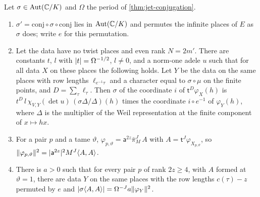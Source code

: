 \begin{lemma}\label{lem:galois-lift}
Let $\sigma\in\mathrm{Aut}(\mathbb{C}/K)$ and $\Omega$ the period of \cref{thm:jet-conjugation}.
\begin{enumerate}[label=\textup{(\alph*)}]
\item $\sigma'=\mathrm{conj}\circ\sigma\circ\mathrm{conj}$ lies in $\mathrm{Aut}(\mathbb{C}/K)$ and permutes the infinite places of $E$ as $\sigma$ does; write $e$ for this permutation.
\item Let the data have no twist places and even rank $N=2m'$. There are constants $t$, $l$ with $\lvert t\rvert=\Omega^{-1/2}$, $l\ne0$, and a norm-one adele $u$ such that for all data $X$ on these places the following holds. Let $Y$ be
the data on the same places with row lengths $\ell_{e^{-1}\tau}$ and a character equal to $\sigma\circ\mu$ on the finite points, and $D=\sum_\tau\ell_\tau$. Then $\sigma$ of the coordinate $i$ of $\mathsf t^D\varphi_X(h)$ is
$t^D\,l\,\chi_{V,Y}(\det u)\,(\sigma\Delta/\Delta)(h)$ times the coordinate $i\circ e^{-1}$ of $\varphi_Y(h)$, where $\Delta$ is the multiplier of the Weil representation at the finite component of $x\mapsto hx$.
\item For a pair $p$ and a tame $\vartheta$, $\varphi_{p,\vartheta}=\mathsf a^{2z}\bar\pi_M^{J}\,A$ with $A=\mathsf t^J\varphi_{X_{p,\vartheta}}$, so $\lVert \varphi_{p,\vartheta}\rVert^2=\lvert \mathsf a^{2z}\rvert^2M^J\langle A,A\rangle$.
\item There is $a>0$ such that for every pair $p$ of rank $2z\ge4$, with $A$ formed at $\vartheta=1$, there are data $Y$ on the same places with the row lengths $c(\tau)-z$ permuted by $e$ and $\lvert \sigma\langle A,A\rangle\rvert=\Omega^{-J}a\lVert \varphi_Y\rVert^2$.
\end{enumerate}
\end{lemma}

